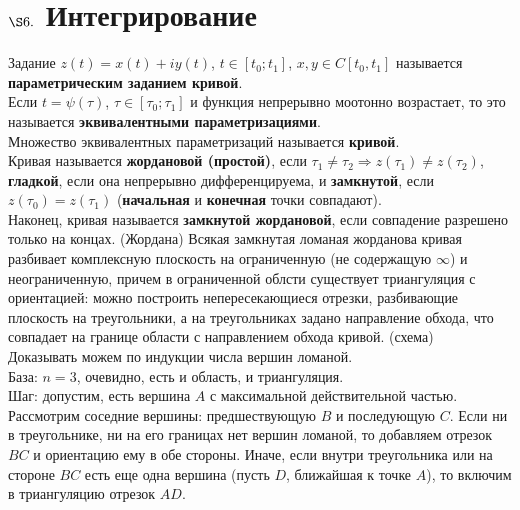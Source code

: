 \section{$\S 6.$ Интегрирование}
Задание $z(t) = x(t) + iy(t)$, $t \in [t_0;t_1]$, $x, y \in C[t_0, t_1]$
называется \textbf{параметрическим заданием кривой}.
\\
Если $t = \psi(\tau)$, $\tau \in [\tau_0; \tau_1]$ и функция непрерывно моотонно
возрастает, то это называется \textbf{эквивалентными параметризациями}.
\\
Множество эквивалентных параметризаций называется \textbf{кривой}.
\\
Кривая называется \textbf{жордановой (простой)}, если $\tau_1 \neq \tau_2
\Rightarrow z(\tau_1) \neq z(\tau_2)$, \textbf{гладкой}, если она непрерывно
дифференцируема, и \textbf{замкнутой}, если $z(\tau_0) = z(\tau_1)$
(\textbf{начальная} и \textbf{конечная} точки совпадают).
\\
Наконец, кривая называется \textbf{замкнутой жордановой}, если совпадение
разрешено только на концах.
\theorem (Жордана)
Всякая замкнутая ломаная жорданова кривая разбивает комплексную плоскость на
ограниченную (не содержащую $\infty$) и неограниченную, причем в ограниченной
облсти существует триангуляция с ориентацией: можно построить непересекающиеся
отрезки, разбивающие плоскость на треугольники, а на треугольниках задано
направление обхода, что совпадает на границе области с направлением обхода
кривой.
\pr (схема)
\\
Доказывать можем по индукции числа вершин ломаной.
\\
База: $n = 3$, очевидно, есть и область, и триангуляция.
\\
Шаг: допустим, есть вершина $A$ с максимальной действительной частью. Рассмотрим
соседние вершины: предшествующую $B$ и последующую $C$. Если ни в треугольнике,
ни на его границах нет вершин ломаной, то добавляем отрезок $BC$ и ориентацию
ему в обе стороны. Иначе, если внутри треугольника или на стороне $BC$ есть еще
одна вершина (пусть $D$, ближайшая к точке $A$), то включим в триангуляцию
отрезок $AD$.